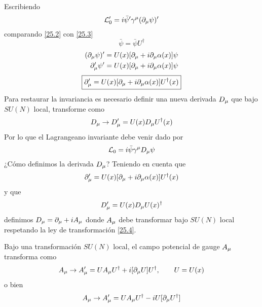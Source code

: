 Escribiendo
\begin{equation}\label{25.3}
  \mathcal{L}_0'=i\bar{\psi}'\gamma^\mu (\partial_\mu \psi)'
\end{equation}
comparando \eqref{25.2} con \eqref{25.3}
\begin{equation}
  \bar{\psi}=\bar{\psi}U^\dagger
\end{equation}
\begin{align}
  (\partial_\mu \psi)'&=U(x)[\partial_\mu +i\partial_\mu \alpha(x)]\psi\\
  \partial_\mu '\psi '&=U(x)[\partial_\mu +i\partial_\mu \alpha (x)]\psi
\end{align}
\begin{equation}
 \boxed{ \partial_\mu '=U(x)[\partial_\mu +i\partial_\mu \alpha(x)]U^\dagger(x)}
\end{equation}
Para restaurar la invariancia es necesario definir una nueva derivada $D_\mu $ que bajo $SU(N)$ local, transforme como 
\begin{equation}
  D_\mu \to D_\mu '=U(x)D_\mu U^\dagger (x)
\end{equation}
Por lo que el Lagrangeano invariante debe venir dado por
\begin{equation}
  \mathcal{L}_0=i\bar{\psi}\gamma^\mu D_\mu \psi
\end{equation}
¿Cómo definimos la derivada $D_\mu $? Teniendo en cuenta que
\begin{equation}\label{25.star}
  \partial_\mu '=U(x)[\partial_\mu +i\partial_\mu \alpha(x)]U^\dagger (x)
\end{equation}
y que
\begin{equation}\label{25.4}
  D_\mu '=U(x)D_\mu U(x)^\dagger
\end{equation}
definimos $D_\mu =\partial_\mu +iA_\mu $ donde $A_\mu$ debe transformar bajo $SU(N)$ local respetando la ley de transformación \eqref{25.4}.

\begin{teor}
	Bajo una transformación $SU(N)$ local, el campo potencial de gauge $A_\mu $ transforma como 
	\begin{equation}
  A_\mu \to A_\mu '=UA_\mu U^\dagger+i[\partial_\mu U]U^\dagger,\qquad U=U(x)
\end{equation}
o bien
\begin{equation}
  A_\mu \to A_\mu '=UA_\mu U^\dagger -iU[\partial_\mu U^\dagger ]
\end{equation}
\end{teor}

